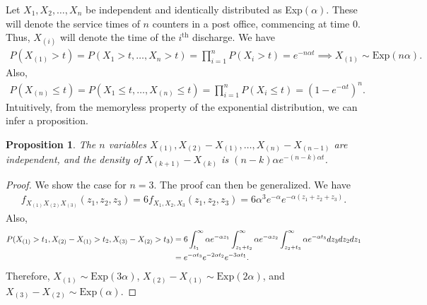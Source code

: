 \documentclass[15pt,a4paper]{book}
\newtheorem{proposition}[theorem]{Proposition}
\theoremstyle{definition}
\begin{document}
Let $X_{1},X_{2},\ldots,X_{n}$ be independent and identically distributed as Exp$(\alpha)$. These will denote the service times of $n$ counters in a post office, commencing at time 0. Thus, $X_{(i)}$ will denote the time of the $i^{\text{th}}$ discharge. We have
\begin{align}
    P(X_{(1)} > t) = P(X_{1}>t,\ldots,X_{n}>t) = \prod_{i=1}^{n} P(X_{i} > t) = e^{-n\alpha t} \implies X_{(1)} \sim \text{Exp}(n \alpha).
\end{align}
Also,
\begin{align*}
    P(X_{(n)} \leq t) = P(X_{1} \leq t, \ldots, X_{(n)} \leq t) = \prod_{i=1}^{n} P(X_{i} \leq t) = (1-e^{-\alpha t})^{n}.
\end{align*}
Intuitively, from the memoryless property of the exponential distribution, we can infer a proposition.
\begin{proposition}
    The $n$ variables $X_{(1)},X_{(2)}-X_{(1)},\ldots,X_{(n)}-X_{(n-1)}$ are independent, and the density of $X_{(k+1)}-X_{(k)}$ is $(n-k)\alpha e^{-(n-k)\alpha t}$.
\end{proposition}
\begin{proof}
    We show the case for $n=3$. The proof can then be generalized. We have
    \begin{align}
        f_{X_{(1)}X_{(2)}X_{(3)}}(z_{1},z_{2},z_{3}) = 6 f_{X_{1},X_{2},X_{3}}(z_{1},z_{2},z_{3}) = 6\alpha^{3} e^{-\alpha} e^{-\alpha(z_{1}+z_{2}+z_{3})}.
    \end{align}
    Also,
    \begin{align}
        P(X_{(1)} > t_{1}, X_{(2)}-X_{(1)} > t_{2}, X_{(3)} - X_{(2)} > t_{3}) &= 6 \int_{t_{1}}^{\infty} \alpha e^{-\alpha z_{1}} \int_{z_{1}+t_{2}}^{\infty} \alpha e^{-\alpha z_{2}} \int_{z_{2}+t_{3}}^{\infty} \alpha e^{-\alpha t_{3}} dz_{3} dz_{2} dz_{1} \notag \\
        &= e^{-\alpha t_{3}} e^{-2\alpha t_{2}} e^{-3\alpha t_{1}}.
    \end{align}
    Therefore, $X_{(1)} \sim \text{Exp}(3\alpha)$, $X_{(2)}-X_{(1)} \sim \text{Exp}(2\alpha)$, and $X_{(3)}-X_{(2)} \sim \text{Exp}(\alpha)$.
\end{proof}
\end{document}
